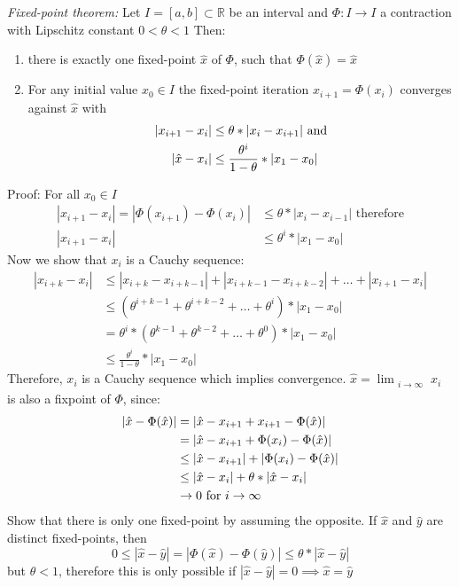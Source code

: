 \emph{Fixed-point theorem:} Let $I=[a,b] \subset \mathbb{R}$ be an interval and $\Phi: I \to I$ a contraction with Lipschitz constant $0 < \theta < 1$
Then:
\begin{enumerate}[label=(\roman*)]
    \item there is exactly one fixed-point $\hat{x}$ of $\Phi$, such that $\Phi(\hat{x}) = \hat{x}$
    \item For any initial value $x_0 \in I$ the fixed-point iteration $x_{i+1} = \Phi(x_i)$ converges against $\hat{x}$ with
    \begin{align*}
        |x_{i+1}-x_i| &\leq \theta *|x_i-x_{i+1}|\hbox{ and}\\
        |\hat{x}-x_i| &\leq \frac{\theta^i}{1- \theta} * |x_1-x_0|
    \end{align*}
\end{enumerate}
Proof: For all $x_0 \in I$
\begin{align*}
    |x_{i+1}-x_i|=|\Phi(x_{i+1})-\Phi(x_i)| &\leq  \theta * |x_i-x_{i-1}| \mbox{ therefore}\\
    |x_{i+1}-x_i| &\leq \theta^i*|x_1-x_0|
\end{align*}
Now we show that $x_i$ is a Cauchy sequence:
\begin{align*}
    |x_{i+k}-x_i| &\leq |x_{i+k}-x_{i+k-1}|+|x_{i+k-1}-x_{i+k-2}|+\ldots + |x_{i+1}-x_i|\\
    &\leq (\theta^{i+k-1}+\theta^{i+k-2}+\ldots+\theta^i)* |x_1-x_0|\\
    &= \theta^i*(\theta^{k-1}+\theta^{k-2}+\ldots+\theta^{0})*|x_1-x_0| \\
    &\leq \frac{\theta^i}{1-\theta}* |x_1-x_0|
\end{align*}
Therefore, $x_i$ is a Cauchy sequence which implies convergence. $\hat{x} = \lim_{\substack{i \to \infty}}x_i$ is also a fixpoint of $\Phi$, since:
\begin{align*}
    |\hat{x} - \Phi(\hat{x})|&=|\hat{x}-x_{i+1}+x_{i+1}-\Phi(\hat{x})|\\
    & = |\hat{x}-x_{i+1}+\Phi(x_i)-\Phi(\hat{x})|\\
    & \leq |\hat{x}-x_{i+1}| + |\Phi(x_i)-\Phi(\hat{x})|\\
    &  \leq |\hat{x}-x_i|+ \theta * |\hat{x}-x_i|\\
    &\to 0  \hbox{ for } i \to \infty
\end{align*}
Show that there is only one fixed-point by assuming the opposite. If $\hat{x}$ and $\hat{y}$ are distinct fixed-points, then
\begin{equation*}
    0 \leq |\hat{x}-\hat{y}| = |\Phi(\hat{x})-\Phi(\hat{y})| \leq \theta * |\hat{x}-\hat{y}|
\end{equation*}
but $\theta < 1$, therefore this is only possible if $|\hat{x}- \hat{y}| = 0 \implies \hat{x} = \hat{y}$


